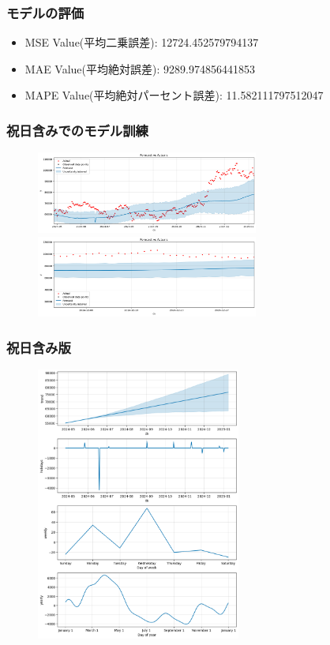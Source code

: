 \documentclass{beamer}  %
\begin{document}
\begin{frame}
    \frametitle{モデルの評価}
\begin{itemize}
   \item  MSE Value(平均二乗誤差): 12724.452579794137\\
   \item  MAE Value(平均絶対誤差): 9289.974856441853\\
   \item  MAPE Value(平均絶対パーセント誤差): 11.582111797512047
\end{itemize}
\end{frame}

\begin{frame}
    \frametitle{祝日含みでのモデル訓練}
    \begin{figure}[h]
        \begin{center}
            \includegraphics[keepaspectratio, width=0.65\textwidth]{pic/pp_fcst2_1.png}\\
            \includegraphics[keepaspectratio, width=0.65\textwidth]{pic/pp_fcst2_2.png}
        \end{center}
    \end{figure}
\end{frame}

\begin{frame}
    \frametitle{祝日含み版}
    \begin{figure}[htbp]
        \includegraphics[keepaspectratio, width=0.6\textwidth]{pic/pp_fcst2.png}
    \end{figure}
\end{frame}
\end{document}
